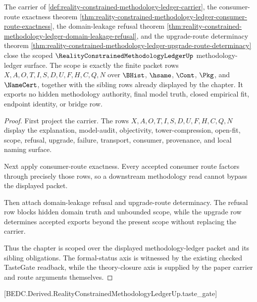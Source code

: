 \begin{theorem}
\label{thm:reality-constrained-methodology-ledger-scoped-closure-record}
The carrier of \autoref{def:reality-constrained-methodology-ledger-carrier}, the consumer-route exactness theorem \autoref{thm:reality-constrained-methodology-ledger-consumer-route-exactness}, the domain-leakage refusal theorem \autoref{thm:reality-constrained-methodology-ledger-domain-leakage-refusal}, and the upgrade-route determinacy theorem \autoref{thm:reality-constrained-methodology-ledger-upgrade-route-determinacy} close the scoped $\RealityConstrainedMethodologyLedgerUp$ methodology-ledger surface. The scope is exactly the finite packet rows $X,A,O,T,I,S,D,U,F,H,C,Q,N$ over $\BHist$, $\hsame$, $\Cont$, $\Pkg$, and $\NameCert$, together with the sibling rows already displayed by the chapter. It exports no hidden methodology authority, final model truth, closed empirical fit, endpoint identity, or bridge row.
\end{theorem}
\begin{proof}
First project the carrier. The rows $X,A,O,T,I,S,D,U,F,H,C,Q,N$ display the explanation, model-audit, objectivity, tower-compression, open-fit, scope, refusal, upgrade, failure, transport, consumer, provenance, and local naming surface.

Next apply consumer-route exactness. Every accepted consumer route factors through precisely those rows, so a downstream methodology read cannot bypass the displayed packet.

Then attach domain-leakage refusal and upgrade-route determinacy. The refusal row blocks hidden domain truth and unbounded scope, while the upgrade row determines accepted exports beyond the present scope without replacing the carrier.

Thus the chapter is scoped over the displayed methodology-ledger packet and its sibling obligations. The formal-status axis is witnessed by the existing checked TasteGate readback, while the theory-closure axis is supplied by the paper carrier and route arguments themselves.
\end{proof}

[BEDC.Derived.RealityConstrainedMethodologyLedgerUp.taste\_gate]


